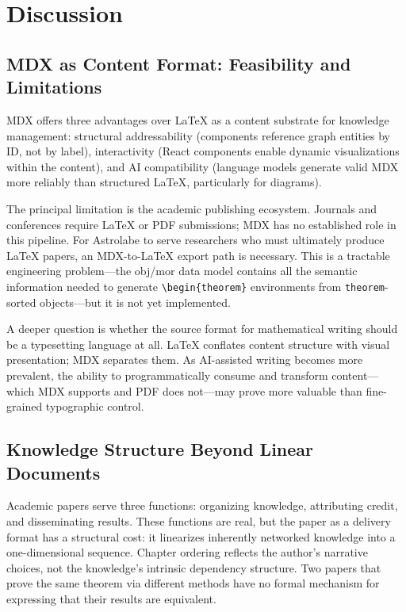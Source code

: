 \section{Discussion}
\label{sec:discussion}


\subsection{MDX as Content Format: Feasibility and Limitations}
\label{sec:disc-mdx}

MDX offers three advantages over \LaTeX{} as a content substrate for knowledge management: structural addressability (components reference graph entities by ID, not by label), interactivity (React components enable dynamic visualizations within the content), and AI compatibility (language models generate valid MDX more reliably than structured \LaTeX{}, particularly for diagrams).

The principal limitation is the academic publishing ecosystem. Journals and conferences require \LaTeX{} or PDF submissions; MDX has no established role in this pipeline. For Astrolabe to serve researchers who must ultimately produce \LaTeX{} papers, an MDX-to-\LaTeX{} export path is necessary. This is a tractable engineering problem---the obj/mor data model contains all the semantic information needed to generate \texttt{\textbackslash begin\{theorem\}} environments from \texttt{theorem}-sorted objects---but it is not yet implemented.

A deeper question is whether the source format for mathematical writing should be a typesetting language at all. \LaTeX{} conflates content structure with visual presentation; MDX separates them. As AI-assisted writing becomes more prevalent, the ability to programmatically consume and transform content---which MDX supports and PDF does not---may prove more valuable than fine-grained typographic control.


\subsection{Knowledge Structure Beyond Linear Documents}
\label{sec:disc-papers}

Academic papers serve three functions: organizing knowledge, attributing credit, and disseminating results. These functions are real, but the paper as a delivery format has a structural cost: it linearizes inherently networked knowledge into a one-dimensional sequence. Chapter ordering reflects the author's narrative choices, not the knowledge's intrinsic dependency structure. Two papers that prove the same theorem via different methods have no formal mechanism for expressing that their results are equivalent.

